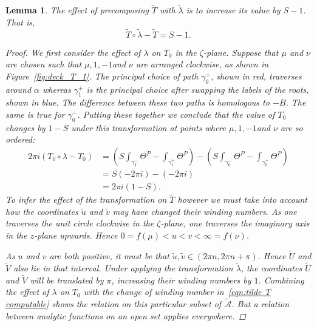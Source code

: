 \documentclass{article}
\numberwithin{equation}{section}
\numberwithin{figure}{section}
\newtheorem{lem}[equation]{Lemma}
\newcommand{\bra}[1]{\left(#1\right)}
\newcommand{\iu}{i}
\renewcommand{\S}{\mathbb{S}}
\begin{document}
\begin{lem}\label{lem:T shift}
The effect of precomposing $\tilde{T}$ with $\tilde{\lambda}$ is to increase its value by $S-1$. That is,
\[
\tilde{T} \circ \tilde{\lambda} - \tilde{T}
= S-1.
\]
\begin{proof}
We first consider the effect of $\lambda$ on $T_0$ in the $\zeta$-plane. Suppose that $\mu$ and $\nu$ are chosen such that $\mu,1,-1$and $\nu$ are arranged clockwise, as shown in Figure~\ref{fig:deck_T_1}. The principal choice of path $\gamma_0^+$, shown in red, traverses around $\alpha$ whereas $\gamma_1^+$ is the principal choice after swapping the labels of the roots, shown in blue.
The difference between these two paths is homologous to $-B$. 
The same is true for $\gamma_0^-$.
Putting these together we conclude that the value of $T_0$ changes by $1-S$ under this transformation at points where $\mu,1,-1$and $\nu$ are so ordered:
\begin{align*}
2\pi\iu (T_0 \circ \lambda - T_0)
&= \bra{ S\int_{\gamma_1^-} \Theta^P - \int_{\gamma_1^+} \Theta^P } - \bra{ S\int_{\gamma_0^-} \Theta^P - \int_{\gamma_0^+} \Theta^P } \\
&= S(-2\pi\iu) - (-2\pi\iu) \\
&= 2\pi\iu (1-S).
\end{align*}
To infer the effect of the transformation on $\tilde{T}$ however we must take into account how the coordinates $\tilde{u}$ and $\tilde{v}$ may have changed their winding numbers. 
As one traverses the unit circle clockwise in the $\zeta$-plane, one traverses the imaginary axis in the $z$-plane upwards. 
Hence $0 = f(\mu) < u < v < \infty = f(\nu)$.

As $u$ and $v$ are both positive, it must be that $\tilde{u},\tilde{v} \in (2\pi n, 2\pi n + \pi)$. Hence $\tilde{U}$ and $\tilde{V}$ also lie in that interval. Under applying the transformation $\tilde{\lambda}$, the coordinates $\tilde{U}$ and $\tilde{V}$ will be translated by $\pi$, increasing their winding numbers by $1$. Combining the effect of $\lambda$ on $T_0$ with the change of winding number in~\eqref{eqn:tilde T computable} shows the relation on this particular subset of $\mathcal{\tilde{A}}$. But a relation between analytic functions on an open set applies everywhere.
\end{proof}
\end{lem}
\end{document}
